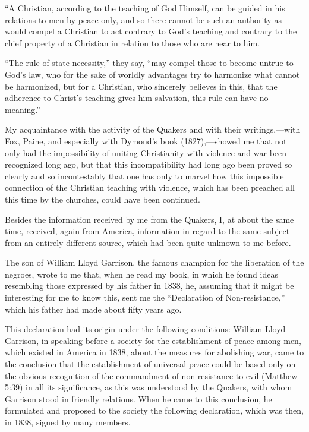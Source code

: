 \documentclass{book}
\begin{document}
“A Christian, according to the teaching of God Himself, can be guided in his relations to men by peace only, and so there cannot be such an authority as would compel a Christian to act contrary to God’s teaching and contrary to the chief property of a Christian in relation to those who are near to him.

“The rule of state necessity,” they say, “may compel those to become untrue to God’s law, who for the sake of worldly advantages try to harmonize what cannot be harmonized, but for a Christian, who sincerely believes in this, that the adherence to Christ’s teaching gives him salvation, this rule can have no meaning.”

My acquaintance with the activity of the Quakers and with their writings,—with Fox, Paine, and especially with Dymond’s book (1827),—showed me that not only had the impossibility of uniting Christianity with violence and war been recognized long ago, but that this incompatibility had long ago been proved so clearly and so incontestably that one has only to marvel how this impossible connection of the Christian teaching with violence, which has been preached all this time by the churches, could have been continued.

Besides the information received by me from the Quakers, I, at about the same time, received, again from America, information in regard to the same subject from an entirely different source, which had been quite unknown to me before.

The son of William Lloyd Garrison, the famous champion for the liberation of the negroes, wrote to me that, when he read my book, in which he found ideas resembling those expressed by his father in 1838, he, assuming that it might be interesting for me to know this, sent me the “Declaration of Non-resistance,” which his father had made about fifty years ago.

This declaration had its origin under the following conditions: William Lloyd Garrison, in speaking before a society for the establishment of peace among men, which existed in America in 1838, about the measures for abolishing war, came to the conclusion that the establishment of universal peace could be based only on the obvious recognition of the commandment of non-resistance to evil (Matthew 5:39) in all its significance, as this was understood by the Quakers, with whom Garrison stood in friendly relations. When he came to this conclusion, he formulated and proposed to the society the following declaration, which was then, in 1838, signed by many members.
\end{document}
